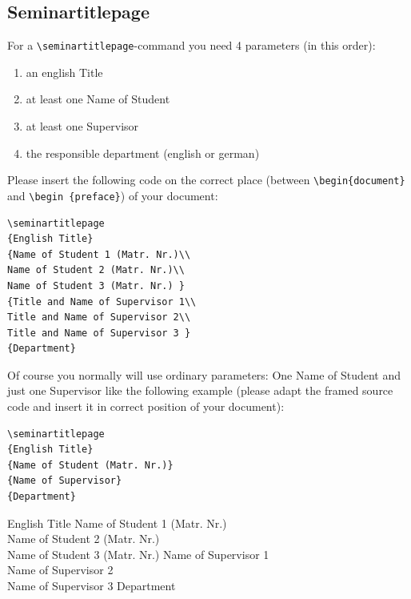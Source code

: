 \documentclass[ trackchanges, hyperref, pdf, mp, mppdf, en]{wise}
\newcommand\code[1]{\texttt{#1}}
\newcommand\command[1]{\code{\textbackslash{}#1}}
\begin{document}
\begin{appendix}\begin{appendices}

\section{Seminartitlepage}

For a \command{seminartitlepage}-command you need 4 parameters (in this order): 

\begin{enumerate}
\item an english Title
\item at least one Name of Student
\item at least one Supervisor
\item the responsible department (english or german) 
\end{enumerate}

Please insert the following code on the correct place (between \command{begin\{document\} } and \command{begin \{preface\}}) of your document:

\lstlatex 

\begin{lstlisting}
\seminartitlepage
{English Title}
{Name of Student 1 (Matr. Nr.)\\
Name of Student 2 (Matr. Nr.)\\
Name of Student 3 (Matr. Nr.) }
{Title and Name of Supervisor 1\\
Title and Name of Supervisor 2\\ 
Title and Name of Supervisor 3 }
{Department}
\end{lstlisting} 
Of course you normally will use ordinary parameters: One Name of Student and just one Supervisor like the following example (please adapt the framed source code and insert it in correct position of your document):
\lstlatex

\begin{lstlisting}
\seminartitlepage
{English Title}
{Name of Student (Matr. Nr.)}
{Name of Supervisor}
{Department}

\end{lstlisting}




\clearpage

\seminartitlepage
{English Title}
{Name of Student 1 (Matr. Nr.)\\
Name of Student 2 (Matr. Nr.)\\
Name of Student 3 (Matr. Nr.) }
{Name of Supervisor 1\\
Name of Supervisor 2\\ 
Name of Supervisor 3}
{Department}


\end{appendices}
\end{appendix}
\end{document}
